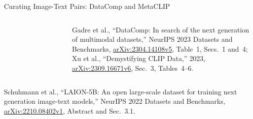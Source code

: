\begin{frame}{Curating Image-Text Pairs: DataComp and MetaCLIP}
\begin{columns}[T,onlytextwidth]
{\begin{tabular}{@{}lr@{}}
        \bottomrule
      \end{tabular}\par}
      \vspace{0.3em}
      {\scriptsize Gadre et al., ``DataComp: In search of the next generation of multimodal datasets,'' NeurIPS 2023 Datasets and Benchmarks, \href{https://arxiv.org/abs/2304.14108v5}{arXiv:2304.14108v5}, Table~1, Secs.~1 and~4; Xu et al., ``Demystifying CLIP Data,'' 2023, \href{https://arxiv.org/abs/2309.16671v6}{arXiv:2309.16671v6}, Sec.~3, Tables~4--6.\par}
  \end{columns}
  \vspace{0.2em}
  {\scriptsize Schuhmann et al., ``LAION-5B: An open large-scale dataset for training next generation image-text models,'' NeurIPS 2022 Datasets and Benchmarks, \href{https://arxiv.org/abs/2210.08402v1}{arXiv:2210.08402v1}, Abstract and Sec.~3.1.\par}
\end{frame}
